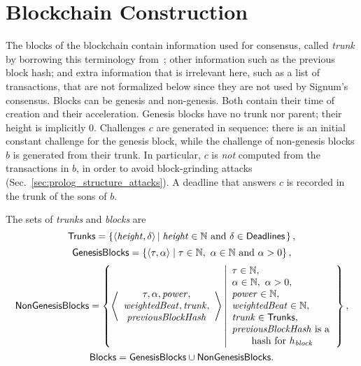 \section{Blockchain Construction}\label{sec:blockchain_construction}

The blocks of the blockchain contain information used for consensus,
called \emph{trunk} by borrowing this terminology from~\cite{CohenP19};
other information such as the previous block hash;
and extra information that is irrelevant here, such as a list of transactions,
that are not formalized below since they are not used by Signum's consensus.
Blocks can be genesis and non-genesis. Both contain their time of creation and their acceleration.
Genesis blocks have no trunk nor parent; their height is implicitly $0$.
Challenges $c$ are generated in sequence: there is an initial constant challenge for the genesis
block, while the challenge of non-genesis blocks $b$ is generated from their trunk.
In particular, $c$ is \emph{not} computed from the transactions in $b$,
in order to avoid block-grinding attacks (Sec.~\ref{sec:prolog_structure_attacks}).
A deadline that answers $c$ is recorded in the trunk of the sons of $b$.
%
\begin{definition}\label{def:trunk}
  The sets of \emph{trunks} and \emph{blocks} are
  \[
  {\mathsf{Trunks}}=\left\{\langle{\mathit{height}},\delta\rangle\left|\;{\mathit{height}}\in\mathbb{N}\text{ and }\delta\in{\mathsf{Deadlines}}\right.\right\},
  \]
  \[
  \GenesisBlocks=\left\{\langle\tau,\alpha\rangle\mid\tau\in\mathbb{N},\ \alpha\in\mathbb{N}\text{ and }\alpha>0\right\},
  \]
  \[
  {\mathsf{NonGenesisBlocks}}=\left\{\left\langle\begin{array}{c}
  \tau,\alpha,{\mathit{power}},\\
  \mathit{weightedBeat},{\mathit{trunk}},\\
  {\mathit{previousBlockHash}}
  \end{array}\right\rangle\left|\begin{array}{l}
  \tau\in\mathbb{N},\\
  \alpha\in\mathbb{N},\ \alpha>0,\\
  {\mathit{power}}\in\mathbb{N},\\
  \mathit{weightedBeat}\in\mathbb{N},\\
  {\mathit{trunk}}\in{\mathsf{Trunks}},\\
  {\mathit{previousBlockHash}}\text{ is a}\\
  \qquad\text{hash for $h_{\mathit{block}}$}
  \end{array}\right.\right\},
  \]
  \[
  {\mathsf{Blocks}}={\mathsf{GenesisBlocks}}\cup{\mathsf{NonGenesisBlocks}}.
  \]
\end{definition}
